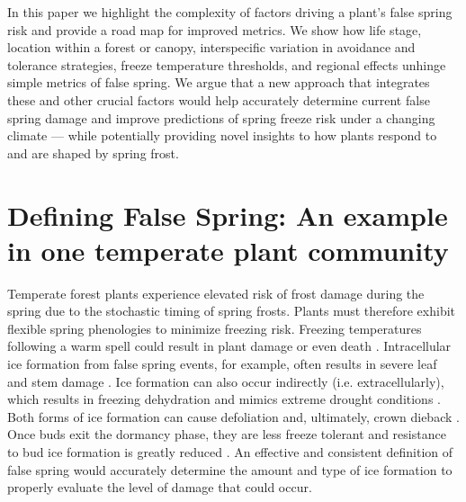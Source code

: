 \documentclass{article}\usepackage[]{graphicx}\usepackage[]{color}
\begin{document}
In this paper we highlight the complexity of factors driving a plant's false spring risk and provide a road map for improved metrics. We show how life stage, location within a forest or canopy, interspecific variation in avoidance and tolerance strategies, freeze temperature thresholds, and regional effects unhinge simple metrics of false spring. We argue that a new approach that integrates these and other crucial factors would help accurately determine current false spring damage and improve predictions of spring freeze risk under a changing climate --- while potentially providing novel insights to how plants respond to and are shaped by spring frost. %

\section{Defining False Spring: An example in one temperate plant community}
Temperate forest plants experience elevated risk of frost damage during the spring due to the stochastic timing of spring frosts. 
Plants must therefore exhibit flexible spring phenologies to minimize freezing risk. Freezing temperatures following a warm spell could result in plant damage or even death \citep{Ludlum1968, Mock2007}. Intracellular ice formation from false spring events, for example, often results in severe leaf and stem damage \citep{Burke1976, Sakai1987}. Ice formation can also occur indirectly (i.e. extracellularly), which results in freezing dehydration and mimics extreme drought conditions \citep{Pearce2001, Beck2004, Hofmann2015}. Both forms of ice formation can cause defoliation and, ultimately, crown dieback \citep{Gu2008}. Once buds exit the dormancy phase, they are less freeze tolerant and resistance to bud ice formation is greatly reduced \citep{Taschler2004, Lenz2013, Vitasse2014a}. An effective and consistent definition of false spring would accurately determine the amount and type of ice formation to properly evaluate the level of damage that could occur.
\end{document}
